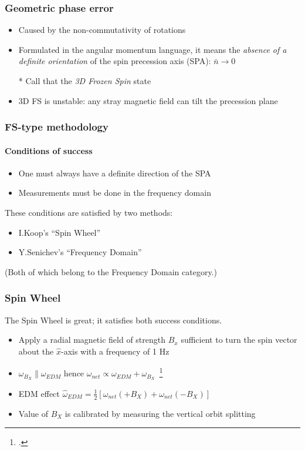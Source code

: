 \documentclass{beamer}
\newcommand{\w}{\omega}
\newcommand{\nbar}{\bar n}
\begin{document}
\begin{frame}\frametitle{Geometric phase error}
  \begin{itemize}
  \item Caused by the non-commutativity of rotations
  \item Formulated in the angular momentum language, it means the \emph{absence of a definite orientation} of
    the spin precession axis (SPA): $\nbar \rightarrow 0$
  \item[*] Call that the \emph{3D Frozen Spin} state
    \item 3D FS is unstable: any stray magnetic field can tilt the precession plane
  \end{itemize}
\end{frame}

\begin{frame}\frametitle{FS-type methodology}\framesubtitle{Conditions of success}
  \begin{itemize}
  \item One must always have a definite direction of the SPA
  \item Measurements must be done in the frequency domain
  \end{itemize}
  These conditions are satisfied by two methods:
  \begin{itemize}
  \item I.Koop's ``Spin Wheel''
  \item Y.Senichev's ``Frequency Domain''
  \end{itemize}
  (Both of which belong to the Frequency Domain category.)
\end{frame}

\begin{frame}\frametitle{Spin Wheel}
  \begin{block}{}
    The Spin Wheel is great; it satisfies both success conditions.
  \end{block}
  \begin{itemize}
  \item Apply a radial magnetic field of strength $B_x$ sufficient to turn the spin vector about
    the $\hat x$-axis with a frequency of 1 Hz
  \item $\w_{B_X} \parallel \w_{EDM}$ hence $\w_{net} \propto \w_{EDM} + \w_{B_X}$~\footcite[p.~6]{Mane:SpinWheel}
  \item EDM effect $\hat\w_{EDM} = \frac12\left[\w_{net}(+B_X) + \w_{net}(-B_X)\right]$
  \item Value of $B_X$ is calibrated by measuring the vertical orbit splitting
  \end{itemize}
\end{frame}
\end{document}
